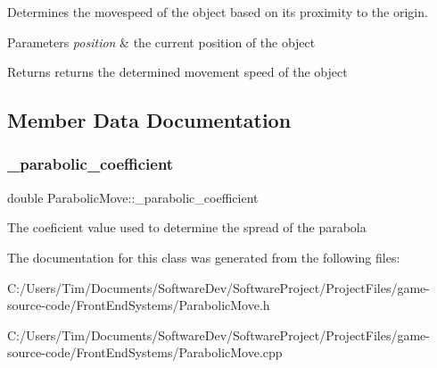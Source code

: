 Determines the movespeed of the object based on its proximity to the origin. 


\begin{DoxyParams}{Parameters}
{\em position} & the current position of the object \\
\hline
\end{DoxyParams}
\begin{DoxyReturn}{Returns}
returns the determined movement speed of the object 
\end{DoxyReturn}


\subsection{Member Data Documentation}
\mbox{\label{class_parabolic_move_a4ae7c298df76cb1a0f5f7d6f85c0977c}} 
\subsubsection{\texorpdfstring{\+\_\+parabolic\+\_\+coefficient}{\_parabolic\_coefficient}}
{\footnotesize\ttfamily double Parabolic\+Move\+::\+\_\+parabolic\+\_\+coefficient\hspace{0.3cm}{\ttfamily [private]}}

The coeficient value used to determine the spread of the parabola 

The documentation for this class was generated from the following files\+:\begin{DoxyCompactItemize}
\item 
C\+:/\+Users/\+Tim/\+Documents/\+Software\+Dev/\+Software\+Project/\+Project\+Files/game-\/source-\/code/\+Front\+End\+Systems/Parabolic\+Move.\+h\item 
C\+:/\+Users/\+Tim/\+Documents/\+Software\+Dev/\+Software\+Project/\+Project\+Files/game-\/source-\/code/\+Front\+End\+Systems/Parabolic\+Move.\+cpp\end{DoxyCompactItemize}
